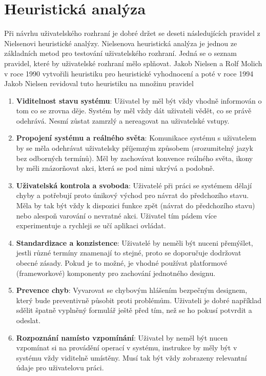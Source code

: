 \documentclass[thesis=M,czech]{FITthesis}[2012/06/26]
\begin{document}
\section{Heuristická analýza}
Při návrhu uživatelského rozhraní je dobré držet se deseti následujících pravidel z Nielsenovi heuristické analýzy. Nielsenova heuristická analýza je jednou ze základních metod pro testování uživatelského rozhraní. Jedná se o seznam pravidel, které by uživatelské rozhraní mělo splňovat. Jakob Nielsen a Rolf Molich v roce 1990 vytvořili heuristiku pro heuristické vyhodnocení a poté v roce 1994 Jakob Nielsen revidoval tuto heuristiku na množinu pravidel \cite{heursitika2}

\begin{enumerate}
	\item
	\textbf{Viditelnost stavu systému}: Uživatel by měl být vždy vhodně informován o tom co se zrovna děje. Systém by měl vždy dát uživateli vědět, co se právě odehrává. Nesmí zůstat zamrzlý a nereagovat na uživatelské vstupy.
	\item
	\textbf{Propojení systému a reálného světa}: Komunikace systému s uživatelem by se měla odehrávat uživatelsky příjemným způsobem (srozumitelný jazyk bez odborných termínů). Měl by zachovávat konvence reálného světa, ikony by měli znázorňovat akci, která se pod nimi ukrývá a podobně. 
	\item
	\textbf{Uživatelská kontrola a svoboda}: Uživatelé při práci se systémem dělají chyby a potřebují proto únikový východ pro návrat do předchozího stavu. Měla by tak být vždy k dispozici funkce zpět (návrat do předchozího stavu) nebo alespoň varování o nevratné akci. Uživatel tím pádem více experimentuje a rychleji se učí aplikaci ovládat. 
	\item
	\textbf{Standardizace a konzistence}: Uživatelé by neměli být nuceni přemýšlet, jestli různé termíny znamenají to stejné, proto se doporučuje dodržovat obecné zásady. Pokud je to možné, je vhodné používat platformové (frameworkové) komponenty pro zachování jednotného designu.
	\item
	\textbf{Prevence chyb}: Vyvarovat se chybovým hlášením bezpečným designem, který bude preventivně působit proti problémům. Uživateli je dobré například sdělit špatně vyplněný formulář ještě před tím, než se ho pokusí potvrdit a odeslat.
	\item
	\textbf{Rozpoznání namísto vzpomínání}: Uživatel by neměl být nucen vzpomínat si na provádění operací v systému, instrukce by měly být v systému vždy viditelně umístěny. Musí tak být vždy zobrazeny relevantní údaje pro uživatelovu práci. 

\end{enumerate}
\end{document}
